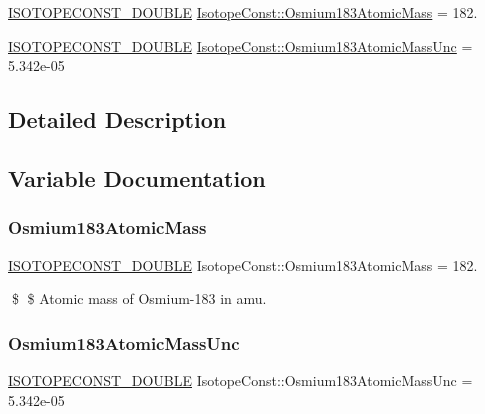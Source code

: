 \begin{DoxyCompactItemize}
\item 
\mbox{\hyperlink{group___isotope_const-_macros_ga8f45a7272ce02c0b4c65c44636ed719a}{I\+S\+O\+T\+O\+P\+E\+C\+O\+N\+S\+T\+\_\+\+D\+O\+U\+B\+LE}} \mbox{\hyperlink{group___isotope_const-_osmium-_os183_ga100afca40c2322eb4199d66309cce467}{Isotope\+Const\+::\+Osmium183\+Atomic\+Mass}} = 182.
\item 
\mbox{\hyperlink{group___isotope_const-_macros_ga8f45a7272ce02c0b4c65c44636ed719a}{I\+S\+O\+T\+O\+P\+E\+C\+O\+N\+S\+T\+\_\+\+D\+O\+U\+B\+LE}} \mbox{\hyperlink{group___isotope_const-_osmium-_os183_ga2dfa8f1173118ff199fa4d96ab628493}{Isotope\+Const\+::\+Osmium183\+Atomic\+Mass\+Unc}} = 5.\+342e-\/05
\end{DoxyCompactItemize}


\subsection{Detailed Description}


\subsection{Variable Documentation}
\mbox{\label{group___isotope_const-_osmium-_os183_ga100afca40c2322eb4199d66309cce467}} 
\subsubsection{\texorpdfstring{Osmium183\+Atomic\+Mass}{Osmium183AtomicMass}}
{\footnotesize\ttfamily \mbox{\hyperlink{group___isotope_const-_macros_ga8f45a7272ce02c0b4c65c44636ed719a}{I\+S\+O\+T\+O\+P\+E\+C\+O\+N\+S\+T\+\_\+\+D\+O\+U\+B\+LE}} Isotope\+Const\+::\+Osmium183\+Atomic\+Mass = 182.}

\$ \$ Atomic mass of Osmium-\/183 in amu. \mbox{\label{group___isotope_const-_osmium-_os183_ga2dfa8f1173118ff199fa4d96ab628493}} 
\subsubsection{\texorpdfstring{Osmium183\+Atomic\+Mass\+Unc}{Osmium183AtomicMassUnc}}
{\footnotesize\ttfamily \mbox{\hyperlink{group___isotope_const-_macros_ga8f45a7272ce02c0b4c65c44636ed719a}{I\+S\+O\+T\+O\+P\+E\+C\+O\+N\+S\+T\+\_\+\+D\+O\+U\+B\+LE}} Isotope\+Const\+::\+Osmium183\+Atomic\+Mass\+Unc = 5.\+342e-\/05}


